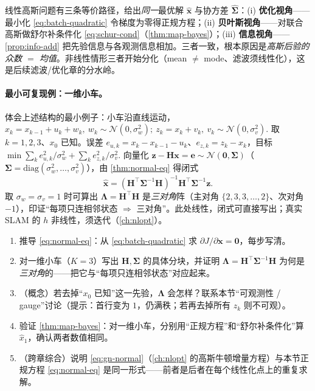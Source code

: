 \begin{insight}[殊途同归]
线性高斯问题有三条等价路径，给出\emph{同一}最优解 $\hat{\mathbf{x}}$ 与协方差 $\hat{\boldsymbol{\Sigma}}$：(i) \textbf{优化视角}——最小化 \cref{eq:batch-quadratic} 令梯度为零得正规方程；(ii) \textbf{贝叶斯视角}——对联合高斯做舒尔补条件化 \cref{eq:schur-cond}（\cref{thm:map-bayes}）；(iii) \textbf{信息视角}——\cref{prop:info-add} 把先验信息与各观测信息相加。三者一致，根本原因是\emph{高斯后验的众数 $=$ 均值}。非线性情形三者开始分化（mean $\ne$ mode、滤波须线性化），这是后续滤波/优化章的分水岭。
\end{insight}

\paragraph{最小可复现例：一维小车。}
体会上述结构的最小例子\cite{gaoxiang2019slam14,barfoot2024state}：小车沿直线运动，
\(
  x_k=x_{k-1}+u_k+w_k,\ w_k\sim\mathcal{N}(0,\sigma_w^2);\
  z_k=x_k+v_k,\ v_k\sim\mathcal{N}(0,\sigma_v^2).
\)
取 $k=1,2,3$、$x_0$ 已知。误差 $e_{u,k}=x_k-x_{k-1}-u_k$、$e_{z,k}=z_k-x_k$，目标
\(
  \min\sum_k e_{u,k}^2/\sigma_w^2+\sum_k e_{z,k}^2/\sigma_v^2.
\)
向量化 $\mathbf{z}-\mathbf{H}\mathbf{x}=\mathbf{e}\sim\mathcal{N}(\mathbf{0},\boldsymbol{\Sigma})$（$\boldsymbol{\Sigma}=\mathrm{diag}(\sigma_w^2,\dots,\sigma_v^2)$），由 \cref{thm:normal-eq} 得闭式
\begin{equation}
  \hat{\mathbf{x}}=(\mathbf{H}^\top\boldsymbol{\Sigma}^{-1}\mathbf{H})^{-1}\mathbf{H}^\top\boldsymbol{\Sigma}^{-1}\mathbf{z}.
  \label{eq:car-solution}
\end{equation}
取 $\sigma_w=\sigma_v=1$ 时可算出 $\boldsymbol{\Lambda}=\mathbf{H}^\top\mathbf{H}$ 是\emph{三对角}阵（主对角 $\{2,3,3,\dots,2\}$、次对角 $-1$），印证“每项只连相邻状态 $\Rightarrow$ 三对角”。此处线性，闭式可直接写出；真实 SLAM 的 $h$ 非线性，须迭代（\cref{ch:nlopt}）。

\begin{practice}
\begin{enumerate}
  \item 推导 \cref{eq:normal-eq}：从 \cref{eq:batch-quadratic} 求 $\partial J/\partial\mathbf{x}=\mathbf{0}$，每步写清。
  \item 对一维小车（$K=3$）写出 $\mathbf{H},\boldsymbol{\Sigma}$ 的具体分块，并证明 $\boldsymbol{\Lambda}=\mathbf{H}^\top\boldsymbol{\Sigma}^{-1}\mathbf{H}$ 为何是\emph{三对角}的——把它与“每项只连相邻状态”对应起来。
  \item （概念）若去掉“$x_0$ 已知”这一先验，$\boldsymbol{\Lambda}$ 会怎样？联系本节“可观测性 / gauge”讨论（提示：首行变为 $1$，仍满秩；若再去掉所有 $z_k$ 则不可观）。
  \item 验证 \cref{thm:map-bayes}：对一维小车，分别用“正规方程”和“舒尔补条件化”算 $\hat{x}_1$，确认两者数值相同。
  \item （跨章综合）说明 \cref{eq:gn-normal}（\cref{ch:nlopt} 的高斯牛顿增量方程）与本节正规方程 \cref{eq:normal-eq} 是同一形式——前者是后者在每个线性化点上的重复求解。
\end{enumerate}
\end{practice}

